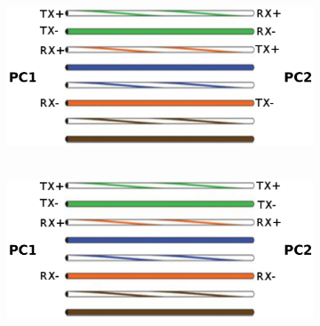 \documentclass[pdftex,12pt,a4paper]{article}
\begin{document}
        \begin{figure}[tbh]
            \centering
            \begin{subfigure}{.5\textwidth}
              \centering
              \includegraphics[width=.95\textwidth]{figures/fig1a}
              \caption{\ }
              \label{fig:sub1}
            \end{subfigure}%
            \begin{subfigure}{.5\textwidth}
              \centering
              \includegraphics[width=.95\textwidth]{figures/fig1b}
              \caption{\ }
              \label{fig:sub2}
            \end{subfigure}
              \vspace{30pt}


\end{figure}
\end{document}
